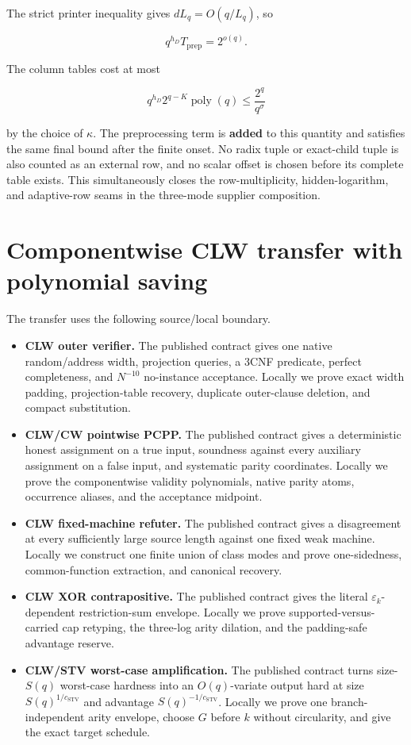 \documentclass[11pt,letterpaper]{article}
\theoremstyle{definition}
\theoremstyle{remark}
\begin{document}
The strict printer inequality gives \(dL_q=O(q/L_q)\), so

\[
q^{h_D}T_{\mathrm{prep}}
{}={}
2^{o(q)}.
\]

The column tables cost at most

\[
q^{h_D}2^{q-K}\operatorname{poly}(q)
\le
\frac{2^q}{q^\sigma}
\]

by the choice of \(\kappa\). The preprocessing term is \textbf{added} to
this quantity and satisfies the same final bound after the finite onset.
No radix tuple or exact-child tuple is also counted as an external row,
and no scalar offset is chosen before its complete table exists. This
simultaneously closes the row-multiplicity, hidden-logarithm, and
adaptive-row seams in the three-mode supplier composition.

\section{Componentwise CLW transfer with polynomial
saving}\label{sec:transfer}

The transfer uses the following source/local boundary.

\begin{itemize}
\item
  \textbf{CLW outer verifier.} The published contract gives one native
  random/address width, projection queries, a 3CNF predicate, perfect
  completeness, and \(N^{-10}\) no-instance acceptance. Locally we prove
  exact width padding, projection-table recovery, duplicate outer-clause
  deletion, and compact substitution.
\item
  \textbf{CLW/CW pointwise PCPP.} The published contract gives a
  deterministic honest assignment on a true input, soundness against
  every auxiliary assignment on a false input, and systematic parity
  coordinates. Locally we prove the componentwise validity polynomials,
  native parity atoms, occurrence aliases, and the acceptance midpoint.
\item
  \textbf{CLW fixed-machine refuter.} The published contract gives a
  disagreement at every sufficiently large source length against one
  fixed weak machine. Locally we construct one finite union of class
  modes and prove one-sidedness, common-function extraction, and
  canonical recovery.
\item
  \textbf{CLW XOR contrapositive.} The published contract gives the
  literal \(\varepsilon_k\)-dependent restriction-sum envelope. Locally
  we prove supported-versus-carried cap retyping, the three-log arity
  dilation, and the padding-safe advantage reserve.
\item
  \textbf{CLW/STV worst-case amplification.} The published contract
  turns size-\(S(q)\) worst-case hardness into an \(O(q)\)-variate
  output hard at size \(S(q)^{1/c_{\mathrm{STV}}}\) and advantage
  \(S(q)^{-1/c_{\mathrm{STV}}}\). Locally we prove one
  branch-independent arity envelope, choose \(G\) before \(k\) without
  circularity, and give the exact target schedule.
\end{itemize}
\end{document}
